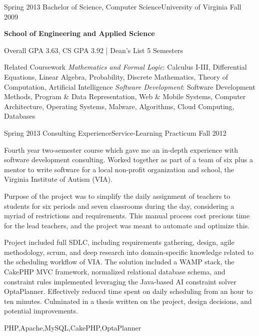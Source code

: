 \begin{scholarship}
  \experience
    {Spring 2013}   {Bachelor of Science, Computer Science}{University of Virginia}
    {Fall 2009}
                    {
                        \textbf{School of Engineering and Applied Science}

                        Overall GPA 3.63, CS GPA 3.92 | Dean's List 5 Semesters 

                        \ifcv
                        \textcolor{accentcolor}{Related Coursework}
                        \textit{Mathematics and Formal Logic}: Calculus I-III, Differential Equations, Linear Algebra, Probability, Discrete Mathematics, Theory of Computation, Artificial Intelligence
                        \textit{Software Development}: Software Development Methods, Program \& Data Representation, Web \& Mobile Systems, Computer Architecture, Operating Systems, Malware, Algorithms, Cloud Computing, Databases
                        \fi
                    }
                    {}
                    {}
\end{scholarship}

\ifcv
\begin{scholarship}
  \experience
    {Spring 2013}  {Consulting Experience}{Service-Learning Practicum}
    {Fall 2012}    {
                        Fourth year two-semester course which gave me an in-depth experience with software development consulting. Worked together as part of a team of six plus a mentor to write software for a local non-profit organization and school, the Virginia Institute of Autism (VIA).

                        \vspace{0.5em}

                        Purpose of the project was to simplify the daily assignment of teachers to students for six periods and seven classrooms during the day, considering a myriad of restrictions and requirements. This manual process cost precious time for the lead teachers, and the project was meant to automate and optimize this.

                        \vspace{0.5em}

                        Project included full SDLC, including requirements gathering, design, agile methodology, scrum, and deep research into domain-specific knowledge related to the scheduling workflow of VIA. The solution included a WAMP stack, the CakePHP MVC framework, normalized relational database schema, and constraint rules implemented leveraging the Java-based AI constraint solver OptaPlanner. Effectively reduced time spent on daily scheduling from an hour to ten minutes. Culminated in a thesis written on the project, design decisions, and potential improvements.
                    }
                    {PHP,Apache,MySQL,CakePHP,OptaPlanner}
                    {}
\end{scholarship}
\fi
